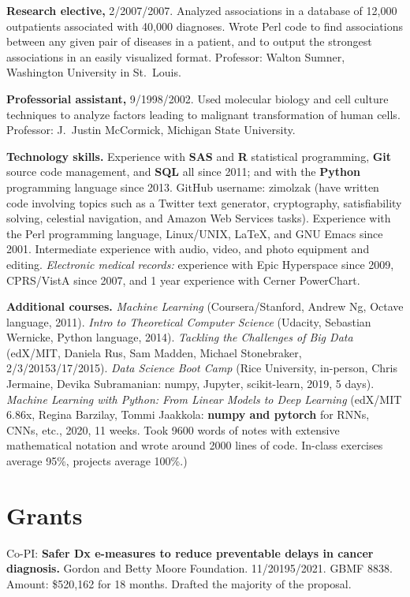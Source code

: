 \documentclass[10pt]{article}
\begin{document}
\textbf{Research elective,} 2/2007/2007. Analyzed associations
in a database of 12,000 outpatients associated with 40,000 diagnoses.
Wrote Perl code to find associations between any given pair of
diseases in a patient, and to output the strongest associations in an
easily visualized format. Professor: Walton Sumner, Washington
University in St.\ Louis.

\textbf{Professorial assistant,} 9/1998/2002. Used molecular
biology and cell culture techniques to analyze factors leading to
malignant transformation of human cells. Professor: J.\ Justin
McCormick, Michigan State University.

\textbf{Technology skills.} Experience with \textbf{SAS} and \textbf{R} statistical
programming, \textbf{Git} source code management, and \textbf{SQL} all since 2011; and
with the \textbf{Python} programming language since 2013. GitHub username:
zimolzak (have written code involving topics such as a Twitter text
generator, cryptography, satisfiability solving, celestial navigation,
and Amazon Web Services tasks). Experience with the Perl programming
language, Linux/UNIX, \LaTeX, and GNU Emacs since 2001. Intermediate
experience with audio, video, and photo equipment and editing.
\emph{Electronic medical records:} experience with Epic Hyperspace
since 2009, CPRS/VistA since 2007, and 1 year experience with Cerner
PowerChart.

\textbf{Additional courses.} \emph{Machine Learning}
(Coursera/Stanford, Andrew Ng, Octave language, 2011). \emph{Intro to
  Theoretical Computer Science} (Udacity, Sebastian Wernicke, Python
language, 2014). \emph{Tackling the Challenges of Big Data} (edX/MIT,
Daniela Rus, Sam Madden, Michael Stonebraker,
2/3/2015\ndash{}3/17/2015). \emph{Data Science Boot Camp} (Rice
University, in-person, Chris Jermaine, Devika Subramanian: numpy,
Jupyter, scikit-learn, 2019, 5 days). \emph{Machine Learning with
  Python: From Linear Models to Deep Learning} (edX/MIT 6.86x, Regina
Barzilay, Tommi Jaakkola: \textbf{numpy and pytorch} for RNNs, CNNs, etc.,
2020, 11 weeks. Took 9600 words of notes with extensive mathematical
notation and wrote around 2000 lines of code. In-class exercises
average 95\%, projects average 100\%.)


\section*{Grants}

Co-PI: \textbf{Safer Dx e-measures to reduce preventable delays in
  cancer diagnosis.} Gordon and Betty Moore Foundation.
11/2019\ndash{}5/2021. GBMF 8838. Amount: \$520,162 for 18 months.
Drafted the majority of the proposal.
\end{document}
